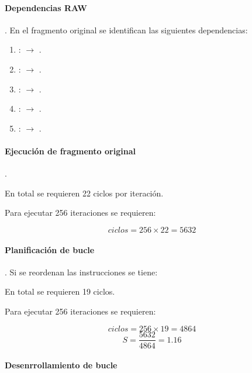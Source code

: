 \paragraph{Dependencias RAW}.
En el fragmento original se identifican las siguientes 
dependencias:

\begin{enumerate}

\item {}:  $\rightarrow$ .
\item {}:  $\rightarrow$ .
\item {}:  $\rightarrow$ .
\item {}:  $\rightarrow$ .
\item {}:  $\rightarrow$ .
\end{enumerate}

\paragraph{Ejecución de fragmento original}.



En total se requieren 22 ciclos por iteración.

Para ejecutar 256 iteraciones se requieren:

\[
ciclos = 256 \times 22 = 5632
\]

\paragraph{Planificación de bucle}.
Si se reordenan las instrucciones se tiene:



En total se requieren 19 ciclos.

Para ejecutar 256 iteraciones se requieren:

\[
ciclos = 256 \times 19 = 4864
\]
\[
S = \frac{5632}{4864} = 1.16
\]

\paragraph{Desenrrollamiento de bucle}



